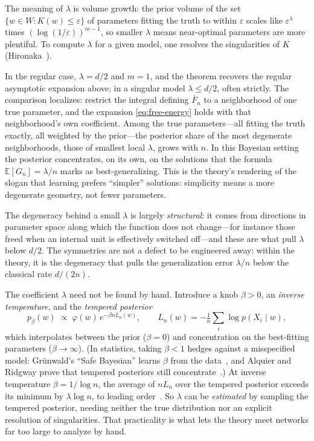 The meaning of $\lambda$ is volume growth: the prior volume of the set $\{w\in W : K(w)\le\varepsilon\}$ of parameters fitting the truth to within $\varepsilon$ scales like $\varepsilon^{\lambda}$ times $(\log(1/\varepsilon))^{m-1}$, so smaller $\lambda$ means near-optimal parameters are more plentiful. To compute $\lambda$ for a given model, one resolves the singularities of $K$ (Hironaka~\cite{hironaka1964}).

In the regular case, $\lambda=d/2$ and $m=1$, and the theorem recovers the regular asymptotic expansion above; in a singular model $\lambda\le d/2$, often strictly. The comparison localizes: restrict the integral defining $\bar F_n$ to a neighborhood of one true parameter, and the expansion \eqref{eq:free-energy} holds with that neighborhood's own coefficient. Among the true parameters---all fitting the truth exactly, all weighted by the prior---the posterior share of the most degenerate neighborhoods, those of smallest local $\lambda$, grows with $n$. In this Bayesian setting the posterior concentrates, on its own, on the solutions that the formula $\mathbb{E}[G_n]=\lambda/n$ marks as best-generalizing. This is the theory's rendering of the slogan that learning prefers ``simpler'' solutions: simplicity means a more degenerate geometry, not fewer parameters.

The degeneracy behind a small $\lambda$ is largely \emph{structural}: it comes from directions in parameter space along which the function does not change---for instance those freed when an internal unit is effectively switched off---and these are what pull $\lambda$ below $d/2$. The symmetries are not a defect to be engineered away: within the theory, it is the degeneracy that pulls the generalization error $\lambda/n$ below the classical rate $d/(2n)$.

The coefficient $\lambda$ need not be found by hand. Introduce a knob $\beta>0$, an \emph{inverse temperature}, and the \emph{tempered posterior}
\[
   p_\beta(w)\;\propto\;\varphi(w)\,e^{-\beta n L_n(w)},
   \qquad L_n(w)=-\tfrac1n\textstyle\sum_i\log p(X_i\mid w),
\]
which interpolates between the prior ($\beta=0$) and concentration on the best-fitting parameters ($\beta\to\infty$). (In statistics, taking $\beta<1$ hedges against a misspecified model: Gr\"unwald's ``Safe Bayesian'' learns $\beta$ from the data~\cite{grunwald2012}, and Alquier and Ridgway prove that tempered posteriors still concentrate~\cite{alquier2020}.) At inverse temperature $\beta=1/\log n$, the average of $nL_n$ over the tempered posterior exceeds its minimum by $\lambda\log n$, to leading order~\cite{watanabe2013}. So $\lambda$ can be \emph{estimated} by sampling the tempered posterior, needing neither the true distribution nor an explicit resolution of singularities. That practicality is what lets the theory meet networks far too large to analyze by hand.

